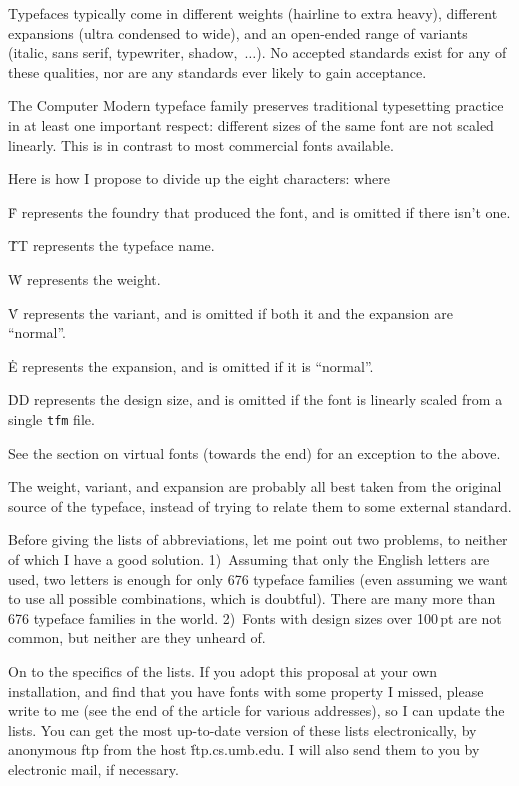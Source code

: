 {\mitem Typefaces typically come in different weights (hairline to extra
heavy), different expansions (ultra condensed to wide), and an
open-ended range of variants (italic, sans serif, typewriter,
shadow,~$\ldots$).  No accepted standards exist for any of these
qualities, nor are any standards ever likely to gain acceptance.

\mitem The Computer Modern typeface family preserves traditional typesetting
practice in at least one important respect: different sizes of the same
font are not scaled linearly.  This is in contrast to most commercial fonts
available.

Here is how I propose to divide up the eight characters:
\noindent
where

\mitem \.{F} represents the foundry that produced the font, and is omitted
if there isn't one.

\mitem \.{TT} represents the typeface name.

\mitem \.W represents the weight.

\mitem \.V represents the variant, and is omitted if both it and the
expansion are ``normal''.

\mitem \.E represents the expansion, and is omitted if it is ``normal''.

\mitem \.{DD} represents the design size, and is omitted if the font is
linearly scaled from a single {\tt tfm} file.

See the section on virtual fonts (towards the end) for an exception to
the above.

The weight, variant, and expansion are probably all best taken from the
original source of the typeface, instead of trying to relate them to
some external standard.

Before giving the lists of abbreviations, let me point out two problems,
to neither of which I have a good solution.  1)~Assuming that only the
English letters are used, two letters is enough for only 676 typeface
families (even assuming we want to use all possible combinations, which
is doubtful).  There are many more than 676 typeface families in the
world.	2)~Fonts with design sizes over 100$\,$pt are not common, but
neither are they unheard of.

On to the specifics of the lists.  If you adopt this proposal at your
own installation, and find that you have fonts with some property I
missed, please write to me (see the end of the article for various
addresses), so I can update the lists.	You can get the
most up-to-date version of these lists electronically, by anonymous ftp
from the host \.{ftp.cs.umb.edu}.  I will also send them to you by
electronic mail, if necessary.

}
